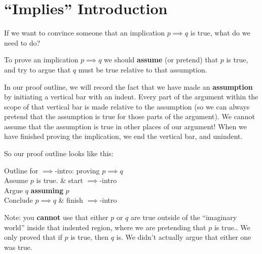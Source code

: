 \section{``Implies'' Introduction}

If we want to convince someone that an implication $p \implies q$ is true, what do we need to do?

To prove an implication $p \implies q$ we should \textbf{assume} (or pretend) that $p$ is true, and try to argue that $q$ must be true relative to that assumption.

In our proof outline, we will record the fact that we have made an \textbf{assumption} by initiating a vertical bar with an indent.  Every part of the argument within the scope of that vertical bar is made relative to the assumption (so we can always pretend that the assumption is true for those parts of the argument).  We cannot assume that the assumption is true in other places of our argument!  When we have finished proving the implication, we end the vertical bar, and unindent.

So our proof outline looks like this:

\begin{fitch*}
	\textrm{Outline for $\implies$-intro:  proving  $p \implies q$}\\
	\hspace{1 cm}\textrm{Assume $p$ is true.} & start $\implies$-intro\\
	\hspace{1 cm}\fa \textrm{ Argue $q$ \textbf{assuming} $p$}\\
	\hspace{1 cm}\textrm{Conclude $p \implies q$} & finish $\implies$-intro\\
\end{fitch*}

Note:  you \textbf{cannot} use that either $p$ or $q$ are true outside of the ``imaginary world'' inside that indented region, where we are pretending that $p$ is true..  We only proved that if $p$ is true, then $q$ is.  We didn't actually argue that either one was true.

